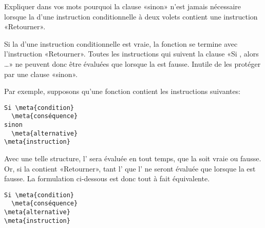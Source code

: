 \begin{exercice}
  Expliquer dans vos mots pourquoi la clause «sinon» n'est jamais
  nécessaire lorsque la  d'une instruction
  conditionnelle à deux volets contient une instruction «Retourner».
  \begin{sol}
    Si la  d'une instruction conditionnelle est
    vraie, la fonction se termine avec l'instruction «Retourner».
    Toutes les instructions qui suivent la clause «Si
    , alors \dots» ne peuvent donc être évaluées que
    lorsque la  est fausse. Inutile de les protéger
    par une clause «sinon».

    Par exemple, supposons qu'une fonction contient les instructions
    suivantes:
    \begin{Schunk}
\begin{Verbatim}[commandchars=\\\{\}]
Si \meta{condition}
  \meta{conséquence}
sinon
  \meta{alternative}
\meta{instruction}
\end{Verbatim}
    \end{Schunk}
    Avec une telle structure, l' sera évaluée en
    tout temps, que la  soit vraie ou fausse. Or, si la
     contient «Retourner», tant l'
    que l' ne seront évaluée que lorsque la
     est fausse. La formulation ci-dessous est donc
    tout à fait équivalente.
    \begin{Schunk}
\begin{Verbatim}[commandchars=\\\{\}]
Si \meta{condition}
  \meta{conséquence}
\meta{alternative}
\meta{instruction}
\end{Verbatim}
    \end{Schunk}
  \end{sol}
\end{exercice}

